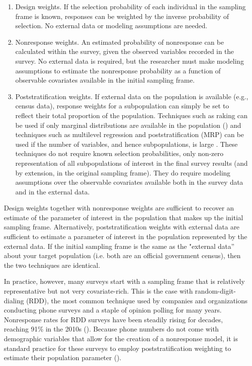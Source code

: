 \message{ !name(survey-sampling-with-ads.tex)}\documentclass[a4paper,12pt]{article}
\theoremstyle{proposition}
\begin{document}
\begin{enumerate}
\item Design weights. If the selection probability of each individual in the sampling frame is known, responses can be weighted by the inverse probability of selection. No external data or modeling assumptions are needed.

\item Nonresponse weights. An estimated probability of nonresponse can be calculated within the survey, given the observed variables recorded in the survey. No external data is required, but the researcher must make modeling assumptions to estimate the nonresponse probability as a function of observable covariates available in the initial sampling frame.

\item Poststratification weights. If external data on the population is available (e.g., census data), response weights for a subpopulation can simply be set to reflect their total proportion of the population. Techniques such as raking can be used if only marginal distributions are available in the population (\cite{Deville1992,Battaglia2009}) and techniques such as multilevel regression and poststratification (MRP) can be used if the number of variables, and hence subpopulations, is large \parencite{Gelman1997}. These techniques do not require known selection probabilities, only non-zero representation of all subpopulations of interest in the final survey results (and by extension, in the original sampling frame). They do require modeling assumptions over the observable covariates available both in the survey data and in the external data.

\end{enumerate}


Design weights together with nonresponse weights are sufficient to recover an estimate of the parameter of interest in the population that makes up the initial sampling frame. Alternatively, poststratification weights with external data are sufficient to estimate a parameter of interest in the population represented by the external data. If the initial sampling frame is the same as the "external data'' about your target population (i.e. both are an official government census), then the two techniques are identical.

In practice, however, many surveys start with a sampling frame that is relatively representative but not very covariate-rich. This is the case with random-digit-dialing (RDD), the most common technique used by companies and organizations conducting phone surveys and a staple of opinion polling for many years. Nonresponse rates for RDD surveys have been steadily rising for decades, reaching 91\% in the 2010s (\cite{Keeter2017,Shirani-Mehr2018}). Because phone numbers do not come with demographic variables that allow for the creation of a nonresponse model, it is standard practice for these surveys to employ poststratification weighting to estimate their population parameter (\cite{Gelman1997}).
\end{document}

